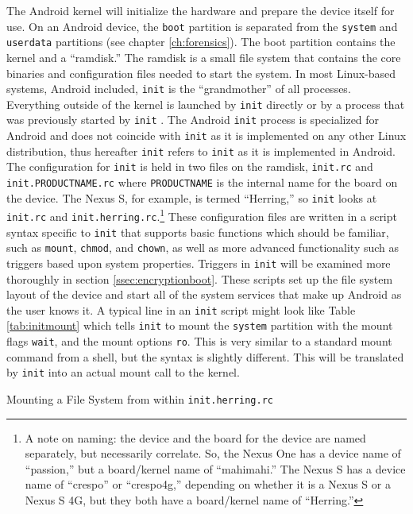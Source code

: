 The Android kernel will initialize the hardware and prepare the device itself for use. On an Android device, the \texttt{boot}
partition is separated from the \texttt{system} and \texttt{userdata} partitions (see chapter \ref{ch:forensics}). The boot
partition contains the kernel and a ``ramdisk.''  The ramdisk is a small file system that contains the core binaries and
configuration files needed to start the system. In most Linux-based systems, Android included, \texttt{init} is the ``grandmother''
of all processes. Everything outside of the kernel is launched by \texttt{init} directly or by a process that was
previously started by \texttt{init} \cite{eneaboot}. The Android \texttt{init} process is specialized for Android and does not coincide with
\texttt{init} as it is implemented on any other Linux distribution, thus hereafter \texttt{init} refers to \texttt{init} as it is
implemented in Android.  The configuration for \texttt{init} is held in two files on the ramdisk, \texttt{init.rc} and
\texttt{init.PRODUCTNAME.rc} where \texttt{PRODUCTNAME} is the internal name for the board on the device. The Nexus S, for example, is termed
``Herring,'' so \texttt{init} looks at \texttt{init.rc} and \texttt{init.herring.rc}.\footnote{A note on naming: the device and the
board for the device are named separately, but necessarily correlate. So, the Nexus One has a device name of ``passion,'' but a
board/kernel name of ``mahimahi.'' The Nexus S has a device name of ``crespo'' or ``crespo4g,'' depending on whether it is a Nexus S
or a Nexus S 4G, but they both have a board/kernel name of ``Herring.''} These configuration files are written in a script syntax
specific to \texttt{init} that supports basic functions which should be familiar, such as \texttt{mount}, \texttt{chmod}, and
\texttt{chown}, as well as more advanced functionality such as triggers based upon system properties.  Triggers in \texttt{init}
will be examined more thoroughly in section \ref{ssec:encryptionboot}. These scripts set up the file system layout of the device and
start all of the system services that make up Android as the user knows it. A typical line in an \texttt{init} script might look
like Table \ref{tab:initmount} which tells \texttt{init} to mount the \texttt{system} partition with the mount flags \texttt{wait}, and the mount
options \texttt{ro}. This is very similar to a standard mount command from a shell, but the syntax is slightly different. This will
be translated by \texttt{init} into an actual mount call to the kernel. 
\begin{table}[!htb]

\caption{Mounting a File System from within \texttt{init.herring.rc}}
\label{tab:initmount}
\end{table}


